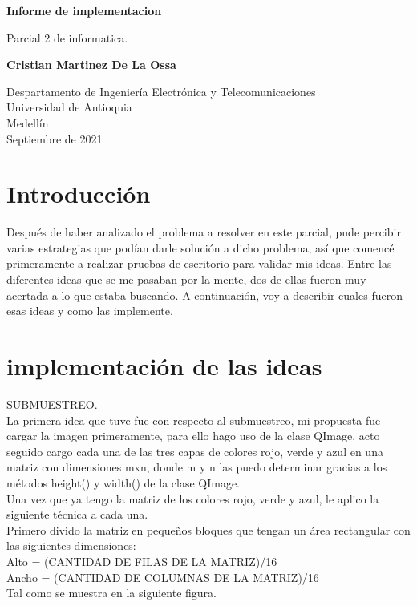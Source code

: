 \documentclass{article}
\begin{document}
\begin{titlepage}
    \begin{center}
        \vspace*{1cm}
            
        \Huge
        \textbf{Informe de implementacion}
            
        \vspace{0.5cm}
        \LARGE
        Parcial 2 de informatica.
            
        \vspace{1.5cm}
            
        \text
        
        
        \textbf{Cristian Martinez De La Ossa}
        
            
        \vfill
            
        \vspace{0.8cm}
            
        \Large
        Despartamento de Ingeniería Electrónica y Telecomunicaciones\\
        Universidad de Antioquia\\
        Medellín\\
        Septiembre de 2021
            
    \end{center}
\end{titlepage}

\tableofcontents
\newpage
\section{Introducción}\label{intro}
Después de haber analizado el problema a resolver en este parcial, pude percibir varias estrategias que podían darle solución a dicho problema, así que comencé primeramente a realizar pruebas de escritorio para validar mis ideas. Entre las diferentes ideas que se me pasaban por la mente, dos de ellas fueron muy acertada a lo que estaba buscando. A continuación, voy a describir cuales fueron esas ideas y como las implemente.


\section{implementación de las ideas} \label{contenido}
SUBMUESTREO.\\
La primera idea que tuve fue con respecto al submuestreo, mi propuesta fue cargar la imagen primeramente, para ello hago uso de la clase QImage, acto seguido cargo cada una de las tres capas de colores rojo, verde y azul en una matriz con dimensiones mxn, donde m y n las puedo determinar gracias a los métodos height() y width() de la clase QImage.\\
Una vez que ya tengo la matriz de los colores rojo, verde y azul, le aplico la siguiente técnica a cada una.\\
Primero divido la matriz en pequeños bloques que tengan un área rectangular con las siguientes dimensiones:\\
Alto = (CANTIDAD DE FILAS DE LA MATRIZ)/16\\
Ancho = (CANTIDAD DE COLUMNAS DE LA MATRIZ)/16\\
Tal como se muestra en la siguiente figura.
\end{document}
